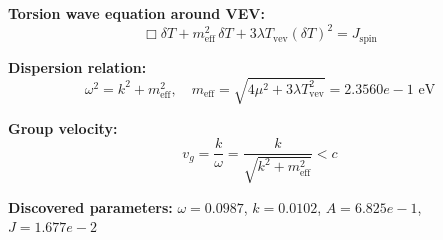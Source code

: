 
\textbf{Torsion wave equation around VEV:}
\begin{equation}
  \Box \delta T + m_{\text{eff}}^2 \, \delta T + 3\lambda T_{\text{vev}} (\delta T)^2 = J_{\text{spin}}
\end{equation}

\textbf{Dispersion relation:}
\begin{equation}
  \omega^2 = k^2 + m_{\text{eff}}^2, \quad
  m_{\text{eff}} = \sqrt{4\mu^2 + 3\lambda T_{\text{vev}}^2} = 2.3560e-1 \text{ eV}
\end{equation}

\textbf{Group velocity:}
\begin{equation}
  v_g = \frac{k}{\omega} = \frac{k}{\sqrt{k^2 + m_{\text{eff}}^2}} < c
\end{equation}

\textbf{Discovered parameters:}
$\omega = 0.0987$, \quad
$k = 0.0102$, \quad
$A = 6.825e-1$, \quad
$J = 1.677e-2$